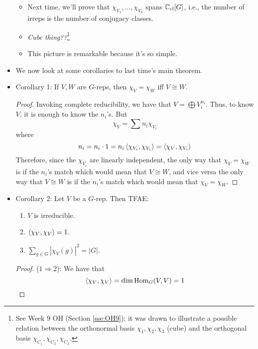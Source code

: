 \documentclass[../notes.tex]{subfiles}
\begin{document}
\begin{itemize}
\begin{itemize}
\begin{itemize}
        \end{itemize}
        \item Next time, we'll prove that $\chi_{V_1},\dots,\chi_{V_k}$ spans $\mathbb{C}_\text{cl}[G]$, i.e., the number of irreps is the number of conjugacy classes.
        \item \emph{Cube thing??}\footnote{See Week 9 OH (Section \ref{sse:OH9}); it was drawn to illustrate a possible relation between the orthonormal basis $\chi_1,\chi_2,\chi_3$ (cube) and the orthogonal basis $\chi_{C_1},\chi_{C_2},\chi_{C_3}$.}
        \item This picture is remarkable because it's so simple.
    \end{itemize}
    \item We now look at some corollaries to last time's main theorem.
    \item Corollary 1: If $V,W$ are $G$-reps, then $\chi_V=\chi_W$ iff $V\cong W$.
    \begin{proof}
        Invoking complete reducibility, we have that $V=\bigoplus V_i^{n_i}$. Thus, to know $V$, it is enough to know the $n_i$'s. But
        \begin{equation*}
            \chi_V = \sum n_i\chi_{V_i}
        \end{equation*}
        where
        \begin{equation*}
            n_i = n_i\cdot 1 = n_i\left\langle{\chi_{V_i},\chi_{V_i}}\right\rangle = \left\langle{\chi_V,\chi_{V_i}}\right\rangle
        \end{equation*}
        Therefore, since the $\chi_{V_i}$ are linearly independent, the only way that $\chi_V=\chi_W$ is if the $n_i$'s match which would mean that $V\cong W$, and vice versa the only way that $V\cong W$ is if the $n_i$'s match which would mean that $\chi_V=\chi_W$.
    \end{proof}
    \item Corollary 2: Let $V$ be a $G$-rep. Then TFAE:
    \begin{enumerate}
        \item $V$ is irreducible.
        \item $\left\langle{\chi_V,\chi_V}\right\rangle=1$.
        \item $\sum_{g\in G}|\chi_V(g)|^2=|G|$.
    \end{enumerate}
    \begin{proof}
        ($1\Rightarrow 2$): We have that
        \begin{equation*}
            \left\langle{\chi_V,\chi_V}\right\rangle = \dim\operatorname{Hom}_G(V,V) = 1
        \end{equation*}

\end{proof}
\end{itemize}
\end{document}
